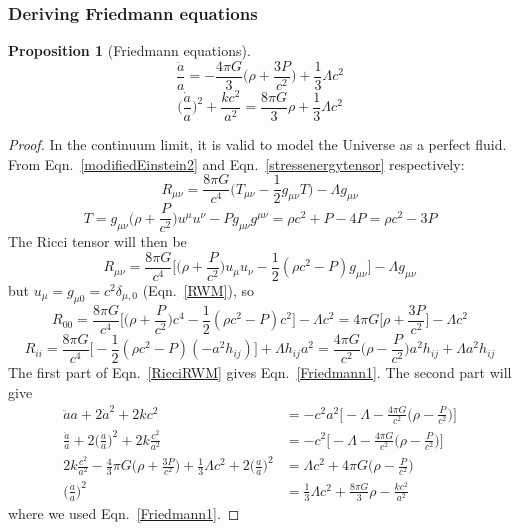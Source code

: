 \documentclass[a4paper]{article}
\theoremstyle{new}
\newtheorem{prop}{Proposition}[section]
\begin{document}
\subsubsection{Deriving Friedmann equations}
\begin{prop}[Friedmann equations]
\begin{equation}
    \frac{\ddot{a}}{a}=-\frac{4\pi G}{3}\bigg(\rho+\frac{3P}{c^2}\bigg)+\frac{1}{3}\Lambda c^2\label{Friedmann1}
\end{equation}
\begin{equation}
    \bigg(\frac{\dot{a}}{a}\bigg)^2+\frac{kc^2}{a^2}=\frac{8\pi G}{3}\rho+\frac{1}{3}\Lambda c^2\label{Friedmann2}
\end{equation}
\end{prop}
\begin{proof}
In the continuum limit, it is valid to model the Universe as a perfect fluid. From Eqn.~\ref{modifiedEinstein2} and Eqn.~\ref{stressenergytensor} respectively:
$$R_{\mu\nu}=\frac{8\pi G}{c^4}\bigg(T_{\mu\nu}-\frac{1}{2}g_{\mu\nu}T\bigg)-\Lambda g_{\mu\nu}$$
$$T=g_{\mu\nu}\bigg(\rho+\frac{P}{c^2}\bigg)u^\mu u^\nu-Pg_{\mu\nu}g^{\mu\nu}=\rho c^2+P-4P=\rho c^2-3P$$
The Ricci tensor will then be
$$R_{\mu\nu}=\frac{8\pi G}{c^4}\bigg[\bigg(\rho+\frac{P}{c^2}\bigg)u_\mu u_\nu-\frac{1}{2}(\rho c^2-P)g_{\mu\nu}\bigg]-\Lambda g_{\mu\nu}$$
but $u_\mu=g_{\mu0}=c^2\delta_{\mu,0}$ (Eqn.~\ref{RWM}), so
$$R_{00}=\frac{8\pi G}{c^4}\bigg[\bigg(\rho+\frac{P}{c^2}\bigg)c^4-\frac{1}{2}(\rho c^2-P)c^2\bigg]-\Lambda c^2=4\pi G\bigg[\rho+\frac{3P}{c^2}\bigg]-\Lambda c^2$$
$$R_{ii}=\frac{8\pi G}{c^4}\bigg[-\frac{1}{2}(\rho c^2-P)(-a^2h_{ij})\bigg]+\Lambda h_{ij}a^2=\frac{4\pi G}{c^2}\bigg(\rho-\frac{P}{c^2}\bigg)a^2h_{ij}+\Lambda a^2h_{ij}$$
The first part of Eqn.~\ref{RicciRWM} gives Eqn.~\ref{Friedmann1}. The second part will give
\begin{align}
    \ddot{a}a+2\dot{a}^2+2kc^2&=-c^2a^2\bigg[-\Lambda-\frac{4\pi G}{c^2}\bigg(\rho-\frac{P}{c^2}\bigg)\bigg]\nonumber\\\frac{\ddot{a}}{a}+2\bigg(\frac{\dot{a}}{a}\bigg)^2+2k\frac{c^2}{a^2}&=-c^2\bigg[-\Lambda-\frac{4\pi G}{c^2}\bigg(\rho-\frac{P}{c^2}\bigg)\bigg]\nonumber\\2k\frac{c^2}{a^2}-\frac{4}{3}\pi G\bigg(\rho+\frac{3P}{c^2}\bigg)+\frac{1}{3}\Lambda c^2+2\bigg(\frac{\dot{a}}{a}\bigg)^2&=\Lambda c^2+4\pi G\bigg(\rho-\frac{P}{c^2}\bigg)\nonumber\\\bigg(\frac{\dot{a}}{a}\bigg)^2&=\frac{1}{3}\Lambda c^2+\frac{8\pi G}{3}\rho-\frac{kc^2}{a^2}\nonumber
\end{align}
where we used Eqn.~\ref{Friedmann1}.
\end{proof}
\end{document}
